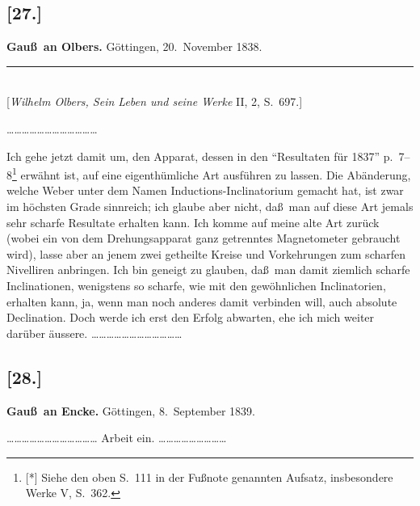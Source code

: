 \documentclass[12pt,a4paper]{article}
\theoremstyle{plain}
\theoremstyle{definition}
\theoremstyle{remark}
\begin{document}
\subsection*{[27.]}
\begin{center}
\textbf{Gau\ss\ an Olbers.} G\"ottingen, 20.~November 1838.
\end{center}
\begin{center}
\rule{6cm}{0.4pt}\\[4pt]
[{\it Wilhelm Olbers, Sein Leben und seine Werke} II, 2, S.~697.]
\end{center}

\smallskip
\ldots\ldots\ldots\ldots\ldots\ldots\ldots\ldots\ldots\ldots\ldots\ldots
\smallskip

Ich gehe jetzt damit um, den Apparat, dessen in den ``Resultaten
f\"ur 1837'' p.~7--8\footnote{[*] Siehe den oben S.~111 in der Fu\ss note
genannten Aufsatz, insbesondere Werke V, S.~362.} erw\"ahnt ist, auf
eine eigenth\"umliche Art ausf\"uhren zu lassen. Die Ab\"anderung,
welche {\sc Weber} unter dem Namen Inductions-Inclinatorium gemacht
hat, ist zwar im h\"ochsten Grade sinnreich; ich glaube aber nicht,
da\ss\ man auf diese Art jemals sehr scharfe Resultate erhalten kann.
Ich komme auf meine alte Art zur\"uck (wobei ein von dem
Drehungsapparat ganz getrenntes Magnetometer gebraucht wird), lasse
aber an jenem zwei getheilte Kreise und Vorkehrungen zum scharfen
Nivelliren anbringen. Ich bin geneigt zu glauben, da\ss\ man damit
ziemlich scharfe Inclinationen, wenigstens so scharfe, wie mit den
gew\"ohnlichen Inclinatorien, erhalten kann, ja, wenn man noch anderes
damit verbinden will, auch absolute Declination. Doch werde ich erst
den Erfolg abwarten, ehe ich mich weiter dar\"uber \"aussere.
\ldots\ldots\ldots\ldots\ldots\ldots\ldots\ldots\ldots\ldots\ldots\ldots

\subsection*{[28.]}
\begin{center}
\textbf{Gau\ss\ an Encke.} G\"ottingen, 8.~September 1839.
\end{center}

\smallskip
\ldots\ldots\ldots\ldots\ldots\ldots\ldots\ldots\ldots\ldots\ldots\ldots
Arbeit ein. \ldots\ldots\ldots\ldots\ldots\ldots\ldots\ldots\ldots
\end{document}
